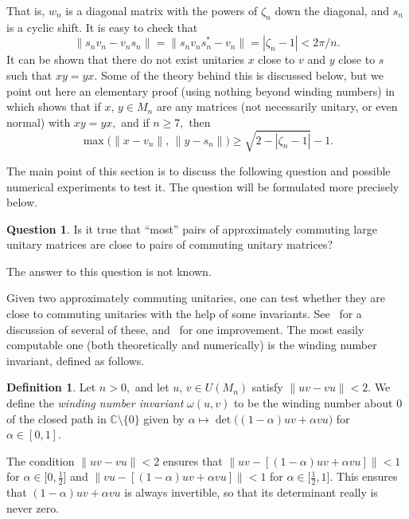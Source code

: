 \documentclass[10pt]{amsart}
\theoremstyle{definition}
\newtheorem{dfn}[thm]{Definition}
\newtheorem{qst}[thm]{Question}
\newcommand{\af}{\alpha}
\newcommand{\zt}{\zeta}
\newcommand{\om}{\omega}
\newcommand{\C}{{\mathbb{C}}}
\begin{document}
That is, $w_n$ is a diagonal matrix with the powers of $\zt_n$ down the
diagonal, and $s_n$ is a cyclic shift.
It is easy to check that
\[
\| s_n v_n - v_n s_n \| = \| s_n v_n s_n^* - v_n \| = | \zt_n - 1 |
    < 2 \pi / n.
\]
It can be shown that there do not exist unitaries $x$
close to $v$ and $y$ close to $s$ such that $x y = y x.$
Some of the theory behind this is discussed below, but we point out here
an elementary proof (using nothing beyond winding numbers)
in~\cite{EL1} which shows that if $x, \, y \in M_n$ are any matrices
(not necessarily unitary, or even normal) with  $x y = y x,$ and
if $n \geq 7,$ then
\[
\max \big( \| x - v_n \|, \, \| y - s_n \| \big)
       \geq \sqrt{2 - | \zt_n - 1 |} - 1.
\]

The
main point of this section is to discuss the following question
and possible numerical experiments to test it.
The question will be formulated more precisely below.

\begin{qst}\label{ACProb1}
Is it true that ``most'' pairs of approximately commuting large
unitary matrices
are close to pairs of commuting unitary matrices?
\end{qst}

The answer to this question is not known.

Given two approximately commuting unitaries, one can test
whether they are close to commuting unitaries with the help
of some invariants.
See~\cite{EL2} for a discussion of several of these,
and~\cite{Ex} for one improvement.
The most easily computable one (both theoretically
and numerically) is the winding number invariant, defined
as follows.

\begin{dfn}\label{D-WndNo}
Let $n > 0,$ and let $u, \, v \in U (M_n)$ satisfy
$\| u v - v u \| < 2.$
We define the {\emph{winding number invariant}} $\om (u, v)$ to be the
winding number about $0$ of the closed path in $\C \setminus \{ 0 \}$
given by $\af \mapsto \det \big( (1 - \af) u v + \af v u \big)$ for
$\af \in [0, 1].$
\end{dfn}

The condition $\| u v - v u \| < 2$ ensures that
$\big\| u v - [(1 - \af) u v + \af v u] \big\| < 1$ for
$\af \in \big[ 0, \frac{1}{2} \big]$ and
$\big\| v u - [(1 - \af) u v + \af v u] \big\| < 1$ for
$\af \in \big[ \frac{1}{2}, 1 \big].$
This ensures that $(1 - \af) u v + \af v u$ is always invertible,
so that its determinant really is never zero.
\end{document}
